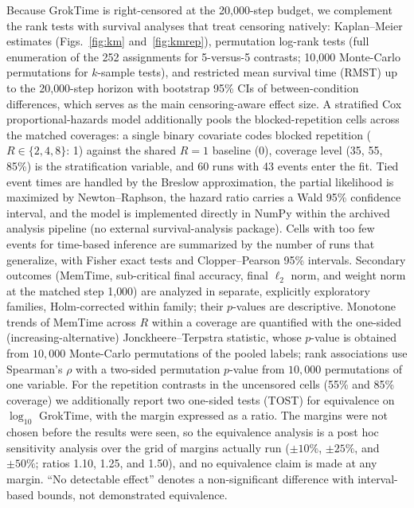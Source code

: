 \documentclass[10pt]{article}
\newcommand{\groktime}{GrokTime}
\newcommand{\memtime}{MemTime}
\begin{document}
Because \groktime{} is right-censored at the 20{,}000-step budget, we complement the rank tests with survival analyses that treat censoring natively: Kaplan--Meier estimates (Figs.~\ref{fig:km} and~\ref{fig:kmrep}), permutation log-rank tests (full enumeration of the 252 assignments for 5-versus-5 contrasts; 10{,}000 Monte-Carlo permutations for $k$-sample tests), and restricted mean survival time (RMST) up to the 20{,}000-step horizon with bootstrap 95\% CIs of between-condition differences, which serves as the main censoring-aware effect size. A stratified Cox proportional-hazards model additionally pools the blocked-repetition cells across the matched coverages: a single binary covariate codes blocked repetition ($R \in \{2,4,8\}$: 1) against the shared $R=1$ baseline (0), coverage level (35, 55, 85\%) is the stratification variable, and 60 runs with 43 events enter the fit. Tied event times are handled by the Breslow approximation, the partial likelihood is maximized by Newton--Raphson, the hazard ratio carries a Wald 95\% confidence interval, and the model is implemented directly in NumPy within the archived analysis pipeline (no external survival-analysis package). Cells with too few events for time-based inference are summarized by the number of runs that generalize, with Fisher exact tests and Clopper--Pearson 95\% intervals. Secondary outcomes (\memtime{}, sub-critical final accuracy, final $\ell_2$ norm, and weight norm at the matched step 1{,}000) are analyzed in separate, explicitly exploratory families, Holm-corrected within family; their $p$-values are descriptive. Monotone trends of \memtime{} across $R$ within a coverage are quantified with the one-sided (increasing-alternative) Jonckheere--Terpstra statistic, whose $p$-value is obtained from $10{,}000$ Monte-Carlo permutations of the pooled labels; rank associations use Spearman's $\rho$ with a two-sided permutation $p$-value from $10{,}000$ permutations of one variable. For the repetition contrasts in the uncensored cells (55\% and 85\% coverage) we additionally report two one-sided tests (TOST) for equivalence on $\log_{10}$ \groktime{}, with the margin expressed as a ratio. The margins were not chosen before the results were seen, so the equivalence analysis is a post hoc sensitivity analysis over the grid of margins actually run ($\pm 10\%$, $\pm 25\%$, and $\pm 50\%$; ratios 1.10, 1.25, and 1.50), and no equivalence claim is made at any margin. ``No detectable effect'' denotes a non-significant difference with interval-based bounds, not demonstrated equivalence.
\end{document}
